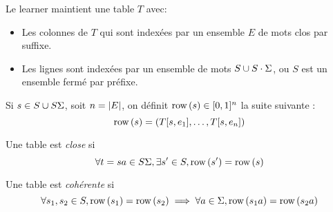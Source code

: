 Le learner maintient une table $T$ avec:

\begin{itemize}
	\item Les colonnes de $T$ qui sont indexées par un ensemble $E$ de mots clos par suffixe.
	\item Les lignes sont indexées par un ensemble de mots $S \cup S\cdot \Sigma$, ou $S$ est
	      un ensemble fermé par préfixe.
\end{itemize}


\begin{definition}
	Si $s \in S \cup S\Sigma$, soit $n = \left|E\right|$, on définit $\text{row}\left(s\right) \in [0,1]^n$ la suite suivante :
	$$ \text{row}\left(s\right) = (T[s,e_1], \ldots, T[s, e_n])$$
\end{definition}

\begin{definition}
	Une table est \emph{close} si
	$$ \forall t = sa \in S\Sigma, \exists s'\in S, \text{row}\left(s'\right) = \text{row}\left(s\right)$$
\end{definition}

\begin{definition}
	Une table est \emph{cohérente} si
	$$ \forall s_1, s_2 \in S, \text{row}\left(s_1\right) = \text{row}\left(s_2\right) \implies \forall a \in \Sigma, \text{row}\left(s_1a\right) = \text{row}\left(s_2a\right)$$
\end{definition}


